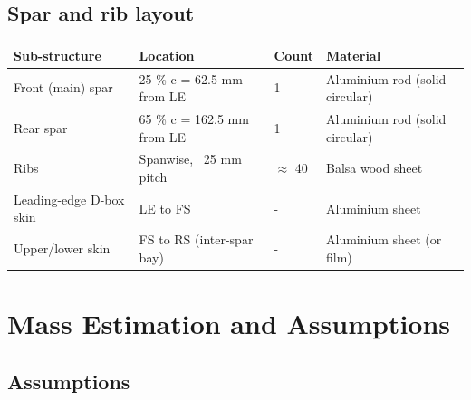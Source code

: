 \documentclass[10pt,a4paper]{article}
\begin{document}
\subsection{Spar and rib layout}


\begin{center}
\begin{tabular}{|l|l|l|l|}
\hline
Sub-structure & Location & Count & Material \\
\hline
Front (main) spar & 25 \% c = 62.5 mm from LE & 1 & Aluminium rod (solid circular) \\
\hline
Rear spar & 65 \% c = 162.5 mm from LE & 1 & Aluminium rod (solid circular) \\
\hline
Ribs & Spanwise, ~25 mm pitch & ${\approx}$ 40 & Balsa wood sheet \\
\hline
Leading-edge D-box skin & LE to FS & - & Aluminium sheet \\
\hline
Upper/lower skin & FS to RS (inter-spar bay) & - & Aluminium sheet (or film) \\
\hline
\end{tabular}
\end{center}






\newpage \section{Mass Estimation and Assumptions}

\subsection{Assumptions}
\end{document}
